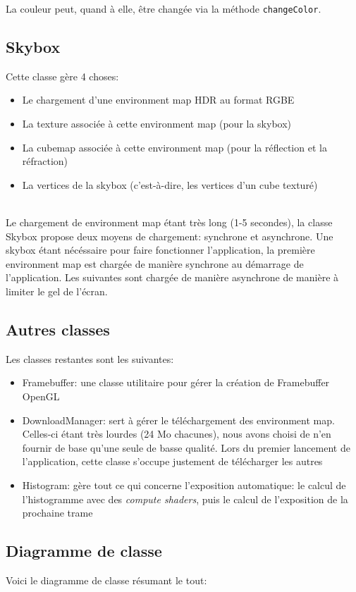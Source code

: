 \documentclass[a4paper,12pt]{article}
\newcommand{\svg}[2][0cm]{
    \begin{figure}[H]
        \centering
        \def\svgwidth{\columnwidth - #1}
        
    \end{figure}
}
\begin{document}
La couleur peut, quand à elle, être changée via la méthode \texttt{changeColor}.

\subsection{Skybox}
Cette classe gère 4 choses:
\begin{itemize}
    \item Le chargement d'une environment map HDR au format RGBE
    \item La texture associée à cette environment map (pour la skybox)
    \item La cubemap associée à cette environment map (pour la réflection et la réfraction)
    \item La vertices de la skybox (c'est-à-dire, les vertices d'un cube texturé)
\end{itemize}

\ \\
Le chargement de environment map étant très long (1-5 secondes), la classe Skybox propose deux moyens de chargement:
synchrone et asynchrone. Une skybox étant nécéssaire pour faire fonctionner l'application, la première environment map
est chargée de manière synchrone au démarrage de l'application. Les suivantes sont chargée de manière asynchrone de
manière à limiter le gel de l'écran.

\subsection{Autres classes}
Les classes restantes sont les suivantes:
\begin{itemize}
    \item Framebuffer: une classe utilitaire pour gérer la création de Framebuffer OpenGL
    \item DownloadManager: sert à gérer le téléchargement des environment map. Celles-ci étant très lourdes (24 Mo chacunes), nous avons choisi de n'en fournir de base qu'une seule de basse qualité. Lors du premier lancement de l'application, cette classe s'occupe justement de télécharger les autres
    \item Histogram: gère tout ce qui concerne l'exposition automatique: le calcul de l'histogramme avec des \emph{compute shaders}, puis le calcul de l'exposition de la prochaine trame
\end{itemize}

\subsection{Diagramme de classe}
Voici le diagramme de classe résumant le tout:
\svg{UML}
\end{document}
